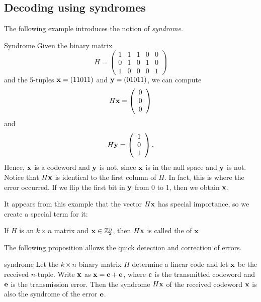 \subsection{Decoding using syndromes}

The following example introduces the notion of \emph{syndrome}.
 
\begin{example}{Syndrome}
Given the binary matrix
\[
H =
\left(
\begin{array}{ccccc}
1 & 1 & 1 & 0 & 0 \\
0 & 1 & 0 & 1 & 0 \\
1 & 0 & 0 & 0 & 1
\end{array}
\right)
\]
and the 5-tuples ${\bold x} = (11011)$ and ${\bold y} =
(01011)$, we can compute
\[
H{\bold x} =
\left(
\begin{array}{c} 0 \\ 0 \\ 0 \end{array}
\right)
\]
and
\[
H{\bold y} =
\left(
\begin{array}{c} 1 \\ 0 \\ 1 \end{array}
\right).
\]
Hence, ${\bold x}$ is a codeword and ${\bold y}$ is not, since
${\bold x}$ is in the null space and ${\bold y}$ is not. Notice that
$H{\bold x}$ is identical to the first column of $H$. In fact, this is
where the error occurred. If we flip the first bit in ${\bold y}$ from
0 to 1, then we obtain ${\bold x}$.  
\end{example}
 
 It appears from this example that the vector $H{\bold x}$ has special importance, so we create a special term for it:
 
 \begin{defn}
If $H$ is an $k \times n$ matrix and ${\bold x} \in \mathbb{Z}_2^n$,
then $H{\bold x}$ is called the  of
${\bold x}$
\end{defn}

\noindent
The following proposition allows
the quick detection and correction of errors.
 
 \begin{prop}{syndrome}
Let the $k \times n$ binary matrix $H$ determine a linear code and let
${\bold x}$ be the received $n$-tuple. Write ${\bold x}$ as ${\bold x}
=  {\bold c} +{\bold e}$, where ${\bold c}$ is the transmitted codeword
and ${\bold e}$ is the transmission error. Then the syndrome  $H{\bold
x}$ of the received codeword ${\bold x}$ is also the syndrome
of the error ${\bold e}$.
\end{prop}
 
